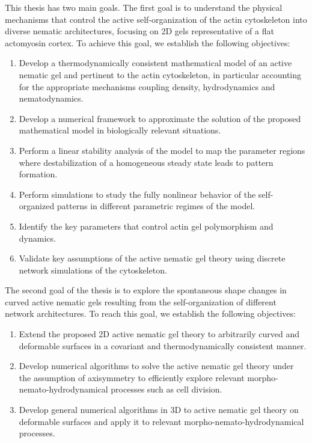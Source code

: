 This thesis has two main goals. The first goal is to understand the physical mechanisms that control the active self-organization of the actin cytoskeleton into diverse nematic architectures, focusing on 2D gels representative of a flat actomyosin cortex.  To achieve this goal, we establish the following objectives:
\begin{enumerate}
	\item Develop a thermodynamically consistent mathematical model of an active nematic gel and pertinent to the actin cytoskeleton, in particular accounting for the appropriate mechanisms coupling density, hydrodynamics and nematodynamics.
	\item Develop a numerical framework to approximate the solution of the proposed mathematical model in biologically relevant situations.
	\item Perform a linear stability analysis of the model to map the parameter regions where destabilization of a homogeneous steady state leads to pattern formation.
	\item Perform simulations to study the fully nonlinear behavior of the self-organized patterns in different parametric regimes of the model.
	\item Identify the key parameters that control actin gel polymorphism and dynamics.
	\item Validate key assumptions of the active nematic gel theory using discrete network simulations of the cytoskeleton.
\end{enumerate}
The second goal of the thesis is to explore the spontaneous shape changes in curved active nematic gels resulting from the self-organization of different network architectures. To reach this goal, we establish the following objectives:
\begin{enumerate}
	\item Extend the proposed 2D active nematic gel theory to arbitrarily curved and deformable surfaces in a covariant and thermodynamically consistent manner.
	\item Develop numerical algorithms to solve the active nematic gel theory under the assumption of axisymmetry to efficiently explore relevant morpho-nemato-hydrodynamical processes such as cell division.
	\item Develop general numerical algorithms in 3D to active nematic gel theory on deformable surfaces and apply it to relevant morpho-nemato-hydrodynamical processes.
\end{enumerate}

